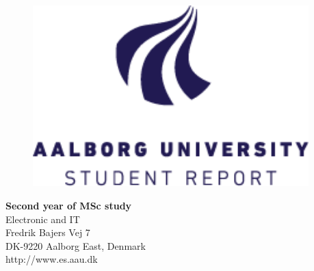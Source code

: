 {}
\thispagestyle{empty}

\begin{minipage}[t]{0.48\textwidth}
\vspace*{-25pt}			%

\begin{figure}[H] 
\includegraphics[width=0.95\textwidth]{report/introduction/aau_logo1}
\end{figure} 
\end{minipage}
\hfill
\begin{minipage}[t]{0.48\textwidth}
{\small 
\textbf{Second year of MSc study}  \\
Electronic and IT \\
Fredrik Bajers Vej 7 \\
DK-9220 Aalborg East, Denmark\\
http://www.es.aau.dk}
\end{minipage}


\vspace*{1cm}

